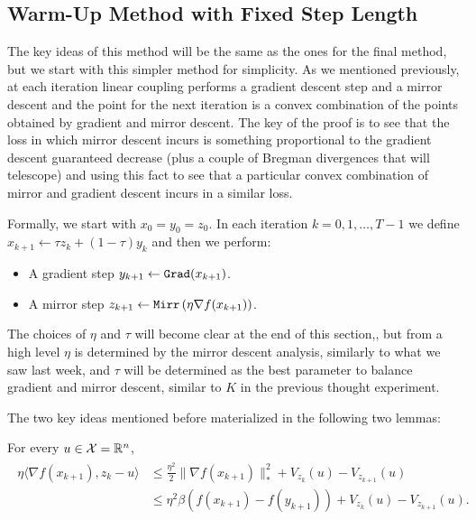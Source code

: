 \subsection{Warm-Up Method with Fixed Step Length}
The key ideas of this method will be the same as the ones for the final method, but we start with this simpler method for simplicity. As we mentioned previously, at each iteration linear coupling performs a gradient descent step and a mirror descent and the point for the next iteration is a convex combination of the points obtained by gradient and mirror descent. The key of the proof is to see that the loss in which mirror descent incurs is something proportional to the gradient descent guaranteed decrease (plus a couple of Bregman divergences that will telescope) and using this fact to see that a particular convex combination of mirror and gradient descent incurs in a similar loss.

Formally, we start with $x_0 = y_0 = z_0$. In each iteration $k= 0, 1, \dots, T-1$ we define $x_{k+1} \gets \tau z_k + (1-\tau) y_k$ and then we perform:
\begin{itemize}
    \item A gradient step $y_{k+1} \gets {\tt{Grad}}(x_{k+1})$.
    \item A mirror step $z_{k+1} \gets {\tt{Mirr}}\left(\eta \nabla f(x_{k+1})\right)$.
\end{itemize}
The choices of $\eta$ and $\tau$ will become clear at the end of this section,, but from a high level $\eta$ is determined by the mirror descent analysis, similarly to what we saw last week, and $\tau$ will be determined as the best parameter to balance gradient and mirror descent, similar to $K$ in the previous thought experiment.

The two key ideas mentioned before materialized in the following two lemmas:
\begin{lemma}\label{lemma:mirror_bound}
    For every $u \in \mathcal{X} = \mathbb{R}^n$,
    \begin{align}\label{mirror_bound_in_linear_coupling}
        \begin{aligned}
            \eta \langle \nabla f(x_{k+1}), z_k -u \rangle & \leq \frac{\eta^2}{2} \| \nabla f(x_{k+1})\|^2_\ast + V_{z_k}(u) - V_{z_{k+1}}(u) \\
                                                       & \leq \eta^2 \beta (f(x_{k+1}) - f(y_{k+1})) + V_{z_k}(u) - V_{z_{k+1}}(u). \\
        \end{aligned}
    \end{align}
\end{lemma}

